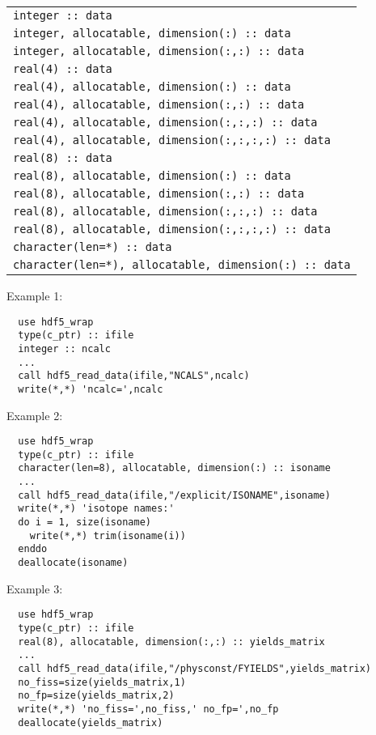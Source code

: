 \vskip 0.2cm
\begin{tabular}{|p{10.5cm}|}
\hline
{\tt integer  :: data} \\
{\tt integer, allocatable, dimension(:) :: data} \\
{\tt integer, allocatable, dimension(:,:) :: data} \\
{\tt real(4) :: data} \\
{\tt real(4), allocatable, dimension(:) :: data} \\
{\tt real(4), allocatable, dimension(:,:) :: data} \\
{\tt real(4), allocatable, dimension(:,:,:) :: data} \\
{\tt real(4), allocatable, dimension(:,:,:,:) :: data} \\
{\tt real(8) :: data} \\
{\tt real(8), allocatable, dimension(:) :: data} \\
{\tt real(8), allocatable, dimension(:,:) :: data} \\
{\tt real(8), allocatable, dimension(:,:,:) :: data} \\
{\tt real(8), allocatable, dimension(:,:,:,:) :: data} \\
{\tt character(len=*) :: data} \\
{\tt character(len=*), allocatable, dimension(:) :: data} \\
\hline
\end{tabular}

\vskip 0.4cm
\goodbreak

\noindent Example 1:
\begin{verbatim}
  use hdf5_wrap
  type(c_ptr) :: ifile
  integer :: ncalc
  ...
  call hdf5_read_data(ifile,"NCALS",ncalc)
  write(*,*) 'ncalc=',ncalc
\end{verbatim}

\vskip 0.3cm

\noindent Example 2:
\begin{verbatim}
  use hdf5_wrap
  type(c_ptr) :: ifile
  character(len=8), allocatable, dimension(:) :: isoname
  ...
  call hdf5_read_data(ifile,"/explicit/ISONAME",isoname)
  write(*,*) 'isotope names:'
  do i = 1, size(isoname)
    write(*,*) trim(isoname(i))
  enddo
  deallocate(isoname)
\end{verbatim}

\vskip 0.3cm

\noindent Example 3:
\begin{verbatim}
  use hdf5_wrap
  type(c_ptr) :: ifile
  real(8), allocatable, dimension(:,:) :: yields_matrix
  ...
  call hdf5_read_data(ifile,"/physconst/FYIELDS",yields_matrix)
  no_fiss=size(yields_matrix,1)
  no_fp=size(yields_matrix,2)
  write(*,*) 'no_fiss=',no_fiss,' no_fp=',no_fp
  deallocate(yields_matrix)
\end{verbatim}

